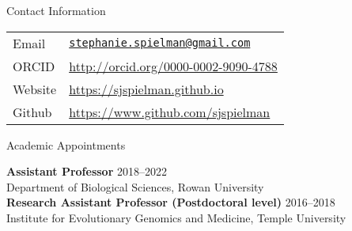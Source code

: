 \documentclass{resume} %
\begin{document}
\vspace*{0.5cm}
\begin{rSection}{Contact Information}
\vspace*{0.25cm}

\begin{table}[H]
	\begin{tabular}{ll}
		Email & \texttt{\href{mailto:stephanie.spielman@gmail.com}{stephanie.spielman@gmail.com}} \\
		ORCID & \url{http://orcid.org/0000-0002-9090-4788} \\
		Website & \url{https://sjspielman.github.io} \\
		Github &  \url{https://www.github.com/sjspielman} \\
	\end{tabular}
\end{table}
\end{rSection}
\vspace*{-0.45cm}



\begin{rSection}{Academic Appointments}
\vspace*{0.25cm}

{\bf Assistant Professor} \hfill {2018--2022} \\
Department of Biological Sciences, Rowan University \\


{\bf Research Assistant Professor (Postdoctoral level)} \hfill {2016--2018} \\
Institute for Evolutionary Genomics and Medicine, Temple University \\
\end{rSection}

\end{document}
